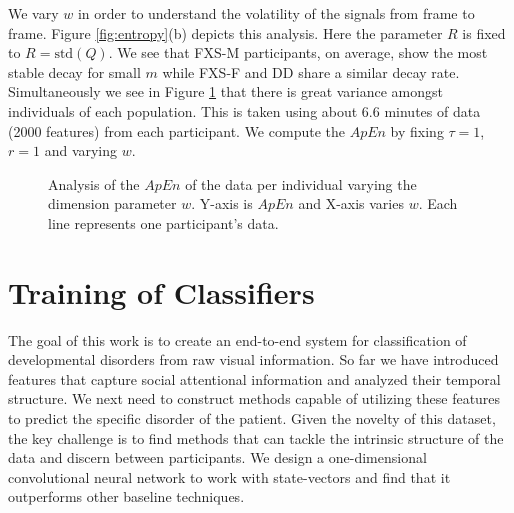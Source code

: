\documentclass[10pt,twocolumn,letterpaper]{article}
\begin{document}
We vary $w$ in order to understand the volatility of the signals from frame to frame. Figure \ref{fig:entropy}(b) depicts this analysis. Here the parameter $R$ is fixed to $R=\text{std}(Q)$. We see that FXS-M participants, on average, show the most stable decay for small $m$ while FXS-F and DD share a similar decay rate. Simultaneously we see in Figure \ref{fig:individual_entropy} that there is great variance amongst individuals of each population. This is taken using about 6.6 minutes of data (2000 features) from each participant. We compute the $ApEn$ by fixing $\tau=1$, $r=1$ and varying $w$. 
\begin{figure}[b]
        \centering
            \hfill
             \hfill
         \centering
        \caption{Analysis of the $ApEn$ of the data per individual varying the dimension parameter $w$. Y-axis is $ApEn$ and X-axis varies $w$. Each line represents one participant's data.}
        \label{fig:individual_entropy}
\end{figure}


\section{Training of Classifiers}
\label{sec:classification}

The goal of this work is to create an end-to-end system for classification of developmental disorders from raw visual information. So far we have introduced features that capture social attentional information and analyzed their temporal structure. We next need to construct methods capable of utilizing these features to predict the specific disorder of the patient. Given the novelty of this dataset, the key challenge is to find methods that can tackle the intrinsic structure of the data and discern between participants. We design a one-dimensional convolutional neural network to work with state-vectors and find that it outperforms other baseline techniques.
\end{document}
